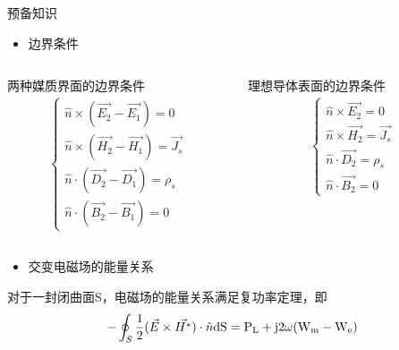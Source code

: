 \begin{frame}{预备知识}
    \begin{itemize}
        \item 边界条件
    \end{itemize}
    \begin{columns}
        \begin{column}{0.5\linewidth}
            两种媒质界面的边界条件
            \begin{align*}
                \begin{cases}
                    \hat{n}\times(\vec{E_2}-\vec{E_1})=0         \\
                    \hat{n}\times(\vec{H_2}-\vec{H_1})=\vec{J_s} \\
                    \hat{n}\cdot(\vec{D_2}-\vec{D_1})=\rho_s     \\
                    \hat{n}\cdot(\vec{B_2}-\vec{B_1})=0
                \end{cases}
            \end{align*}
        \end{column}
        \begin{column}{0.5\linewidth}
            理想导体表面的边界条件
            \begin{align*}
                \begin{cases}
                    \hat{n}\times\vec{E_2}=0         \\
                    \hat{n}\times\vec{H_2}=\vec{J_s} \\
                    \hat{n}\cdot\vec{D_2}=\rho_s     \\
                    \hat{n}\cdot\vec{B_2}=0
                \end{cases}
            \end{align*}
        \end{column}
    \end{columns}
\end{frame}

\begin{frame}
    \begin{itemize}
        \item 交变电磁场的能量关系
    \end{itemize}
    对于一封闭曲面S，电磁场的能量关系满足复功率定理，即
    \begin{align*}
        -\oint_S\frac{1}{2}(\vec{E}\times\vec{H^*})\cdot\hat{n}\rm{d}S=P_L+\rm{j}2\omega(W_m-W_e)
    \end{align*}
\end{frame}

